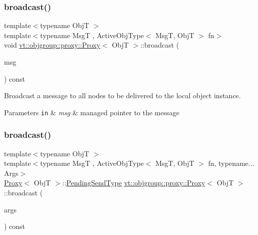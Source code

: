 \subsubsection{\texorpdfstring{broadcast()}{broadcast()}\hspace{0.1cm}{\footnotesize\ttfamily [2/4]}}
{\footnotesize\ttfamily template$<$typename ObjT $>$ \\
template$<$typename MsgT , Active\+Obj\+Type$<$ Msg\+T, Obj\+T $>$ fn$>$ \\
void \hyperlink{structvt_1_1objgroup_1_1proxy_1_1_proxy}{vt\+::objgroup\+::proxy\+::\+Proxy}$<$ ObjT $>$\+::broadcast (\begin{DoxyParamCaption}\item[{\hyperlink{namespacevt_a9f5ebd62ee9d6dd8829e3e1cc4f858e9}{Msg\+Ptr}$<$ MsgT $>$}]{msg }\end{DoxyParamCaption}) const}



Broadcast a message to all nodes to be delivered to the local object instance. 


\begin{DoxyParams}[1]{Parameters}
\mbox{\tt in}  & {\em msg} & managed pointer to the message \\
\hline
\end{DoxyParams}
\mbox{\label{structvt_1_1objgroup_1_1proxy_1_1_proxy_ae4f7ac79675f035f8932e11143a4c4d3}} 
\subsubsection{\texorpdfstring{broadcast()}{broadcast()}\hspace{0.1cm}{\footnotesize\ttfamily [3/4]}}
{\footnotesize\ttfamily template$<$typename ObjT $>$ \\
template$<$typename MsgT , Active\+Obj\+Type$<$ Msg\+T, Obj\+T $>$ fn, typename... Args$>$ \\
\hyperlink{structvt_1_1objgroup_1_1proxy_1_1_proxy}{Proxy}$<$ ObjT $>$\+::\hyperlink{structvt_1_1objgroup_1_1proxy_1_1_proxy_a1bdf8713203531d306702a024872bb08}{Pending\+Send\+Type} \hyperlink{structvt_1_1objgroup_1_1proxy_1_1_proxy}{vt\+::objgroup\+::proxy\+::\+Proxy}$<$ ObjT $>$\+::broadcast (\begin{DoxyParamCaption}\item[{Args \&\&...}]{args }\end{DoxyParamCaption}) const}



